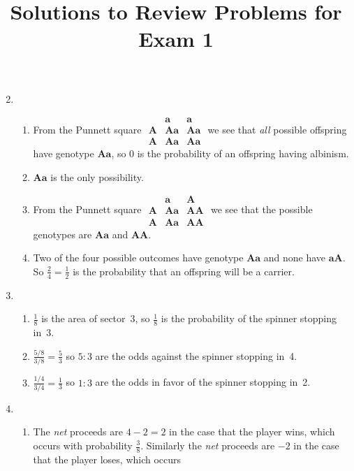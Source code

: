\documentclass[12pt]{article}
\author{}\date{}
\title{Solutions to Review Problems for Exam 1}\author{}
\begin{document}
\maketitle
\pagestyle{empty}
\begin{enumerate}
\setcounter{enumi}{1}
\item\begin{enumerate}\item From the Punnett square
$\begin{array}{c|cc}
&\mathbold{a}&\mathbold{a}\\\hline
\mathbold{A}&\mathbold{Aa}&\mathbold{Aa}\\
\mathbold{A}&\mathbold{Aa}&\mathbold{Aa}\end{array}$
we see that {\em all} possible offspring have
genotype $\mathbold{Aa}$, so $0$ is the probability
of an offspring having albinism.
\item $\mathbold{Aa}$ is the only possibility.
\item From the Punnett square
$\begin{array}{c|cc}
&\mathbold{a}&\mathbold{A}\\\hline
\mathbold{A}&\mathbold{Aa}&\mathbold{AA}\\
\mathbold{A}&\mathbold{Aa}&\mathbold{AA}\end{array}$
we see that the possible genotypes are
$\mathbold{Aa}$ and $\mathbold{AA}$.
\item Two of the four possible outcomes have genotype
$\mathbold{Aa}$ and none have
$\mathbold{aA}$. So $\frac{2}{4}=\frac{1}{2}$ is the probability
that an offspring will be a carrier.
\end{enumerate}
\item\begin{enumerate}
\item $\frac{1}{8}$ is the area of sector~3, so $\frac{1}{8}$
is the probability of the spinner stopping in~3.
\item $\frac{5/8}{3/8}=\frac{5}{3}$ so $5:3$ are the odds
against the spinner stopping in~4.
\item $\frac{1/4}{3/4}=\frac{1}{3}$ so $1:3$ are the odds
in favor of the spinner stopping in~2.
\end{enumerate}
\item\begin{enumerate}\item The {\em net} proceeds
are $4-2=2$ in the case that the player wins, which occurs
with probability $\frac{3}{8}$. Similarly
the {\em net} proceeds are $-2$ in the case that the player loses, which occurs

\end{enumerate}
\end{enumerate}
\end{document}
